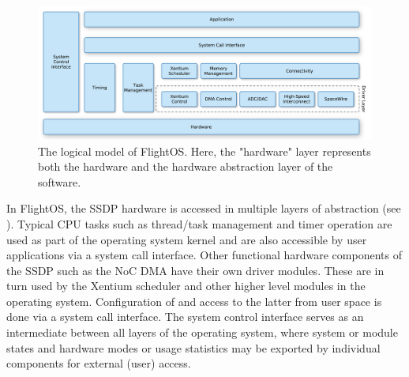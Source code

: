 \begin{figure}[htb]
\begin{center}
	\includegraphics[width=\columnwidth]{images/OS_logical}
	\caption{The logical model of FlightOS. Here, the "hardware" layer
	represents both the hardware and the hardware abstraction layer of
	the software.}
	\label{fig:logical_model}
\end{center}
\end{figure}

In FlightOS, the \gls{SSDP} hardware is accessed in multiple layers of
abstraction (see ). Typical \gls{CPU} tasks such as thread/task
management and timer operation are used as part of the operating system kernel
and are also accessible by user applications via a system call interface.
Other functional hardware components of the \gls{SSDP} such as the \gls{NoC}
\gls{DMA} have their own driver modules. These are in turn used by the
\gls{Xentium} scheduler and other higher level modules in the operating system.
Configuration of and access to the latter from user space is done via a system
call interface. The system control interface serves as an intermediate between
all layers of the operating system, where system or module states and hardware
modes or usage statistics may be exported by individual components for external
(user) access.






